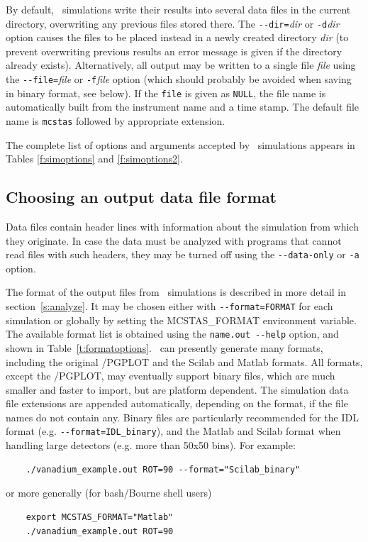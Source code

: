 By default, \MCS\ simulations write their results into several data files in the
current directory, overwriting any previous files stored there. The
\verb+--dir=+\textit{dir} or \verb+-d+\textit{dir} option causes the files to be
placed instead in a newly created directory \textit{dir} (to prevent overwriting
previous results an error message is given if the directory already exists).
Alternatively, all output may be written to a single file \textit{file} using
the \verb+--file=+\textit{file} or \verb+-f+\textit{file} option (which should
probably be avoided when saving in binary format, see below). If the \verb+file+ is given as \verb+NULL+, the file name is automatically built from the instrument name and a time stamp. The default file name is \verb+mcstas+ followed by appropriate extension.

The complete list of options
and arguments accepted by \MCS\ simulations appears in
Tables \ref{f:simoptions} and \ref{f:simoptions2}.

\subsection{Choosing an output data file format}

Data files contain header lines with information about the
simulation from which they originate. In case the data must be analyzed
with programs that cannot read files with such headers, they may be
turned off using the \verb+--data-only+ or \verb+-a+ option.

The format of the output files from \MCS\ simulations is described in
more detail in section~\ref{s:analyze}. It may be chosen either with \verb+--format=FORMAT+ for each simulation or globally by setting the MCSTAS\_FORMAT environment variable. 
The available format list is obtained using the \verb+name.out --help+ option, and shown in Table~\ref{t:formatoptions}.      
\MCS\ can presently generate many formats, including the original \MCS /PGPLOT and the Scilab and Matlab formats. All formats, except the \MCS /PGPLOT, may eventually support binary files, which are much smaller and faster to import, but are platform dependent. The simulation data file extensions are appended automatically, depending on the format, if the file names do not contain any. Binary files are particularly recommended for the IDL format (e.g. \verb+--format=IDL_binary+), and the Matlab and Scilab format when handling large detectors (e.g. more than 50x50 bins). For example:
\begin{verbatim}
    ./vanadium_example.out ROT=90 --format="Scilab_binary"
\end{verbatim}
or more generally (for bash/Bourne shell users)
\begin{verbatim}
    export MCSTAS_FORMAT="Matlab"
    ./vanadium_example.out ROT=90
\end{verbatim}


